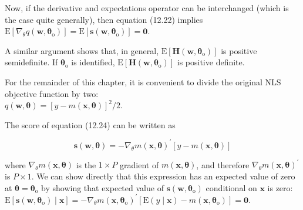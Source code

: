 \documentclass[10pt]{article}
\begin{document}
Now, if the derivative and expectations operator can be interchanged (which is the case quite generally), then equation (12.22) implies\\
$\mathrm{E}\left[\nabla_{\theta} q\left(\mathbf{w}, \boldsymbol{\theta}_{\mathrm{o}}\right)\right]=\mathrm{E}\left[\mathbf{s}\left(\mathbf{w}, \boldsymbol{\theta}_{\mathrm{o}}\right)\right]=\mathbf{0}$.

A similar argument shows that, in general, $\mathrm{E}\left[\mathbf{H}\left(\mathbf{w}, \boldsymbol{\theta}_{\mathrm{o}}\right)\right]$ is positive semidefinite. If $\boldsymbol{\theta}_{\mathrm{o}}$ is identified, $\mathrm{E}\left[\mathbf{H}\left(\mathbf{w}, \boldsymbol{\theta}_{\mathrm{o}}\right)\right]$ is positive definite.

For the remainder of this chapter, it is convenient to divide the original NLS objective function by two:\\
$q(\mathbf{w}, \boldsymbol{\theta})=[y-m(\mathbf{x}, \boldsymbol{\theta})]^{2} / 2$.

The score of equation (12.24) can be written as


\begin{equation*}
\mathbf{s}(\mathbf{w}, \boldsymbol{\theta})=-\nabla_{\theta} m(\mathbf{x}, \boldsymbol{\theta})^{\prime}[y-m(\mathbf{x}, \boldsymbol{\theta})] \tag{12.25}
\end{equation*}


where $\nabla_{\theta} m(\mathbf{x}, \boldsymbol{\theta})$ is the $1 \times P$ gradient of $m(\mathbf{x}, \boldsymbol{\theta})$, and therefore $\nabla_{\theta} m(\mathbf{x}, \boldsymbol{\theta})^{\prime}$ is $P \times 1$. We can show directly that this expression has an expected value of zero at $\boldsymbol{\theta}=\boldsymbol{\theta}_{\mathrm{o}}$ by showing that expected value of $\mathbf{s}\left(\mathbf{w}, \boldsymbol{\theta}_{\mathrm{o}}\right)$ conditional on $\mathbf{x}$ is zero:\\
$\mathrm{E}\left[\mathbf{s}\left(\mathbf{w}, \boldsymbol{\theta}_{\mathrm{o}}\right) \mid \mathbf{x}\right]=-\nabla_{\theta} m\left(\mathbf{x}, \boldsymbol{\theta}_{\mathrm{o}}\right)^{\prime}\left[\mathrm{E}(y \mid \mathbf{x})-m\left(\mathbf{x}, \boldsymbol{\theta}_{\mathrm{o}}\right)\right]=\mathbf{0}$.
\end{document}
